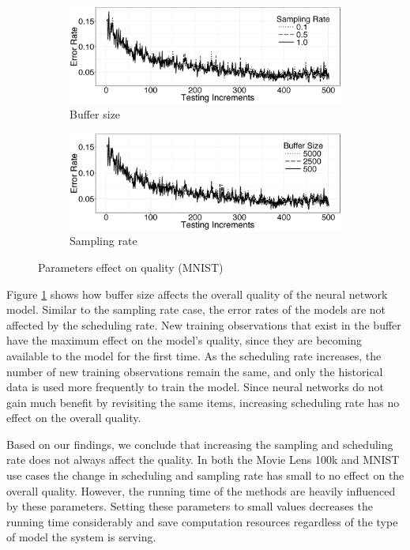 \documentclass{vldb}
\begin{document}
\begin{figure}[h]
\begin{subfigure}{\columnwidth}
\centering
\includegraphics[width=\columnwidth]{../images/experiment-results/mnist-sampling-improved.eps}
\caption{Buffer size}
\label{fig:mnist-buffer-size}
\end{subfigure}
\begin{subfigure}{\columnwidth}
\centering
\includegraphics[width=\columnwidth]{../images/experiment-results/mnist-buffersize-improved.eps}
\caption{Sampling rate}
\label{fig:mnist-sample-rate}
\end{subfigure}
\caption{Parameters effect on quality (MNIST)}
\end{figure}

Figure \ref{fig:mnist-buffer-size} shows how buffer size affects the overall quality of the neural network model.
Similar to the sampling rate case, the error rates of the models are not affected by the scheduling rate.
New training observations that exist in the buffer have the maximum effect on the model's quality, since they are becoming available to the model for the first time.
As the scheduling rate increases, the number of new training observations remain the same, and only the historical data is used more frequently to train the model.
Since neural networks do not gain much benefit by revisiting the same items, increasing scheduling rate has no effect on the overall quality.

Based on our findings, we conclude that increasing the sampling and scheduling rate does not always affect the quality.
In both the Movie Lens 100k and MNIST use cases the change in scheduling and sampling rate has small to no effect on the overall quality.
However, the running time of the methods are heavily influenced by these parameters.
Setting these parameters to small values decreases the running time considerably and save computation resources regardless of the type of model the system is serving.
\end{document}
